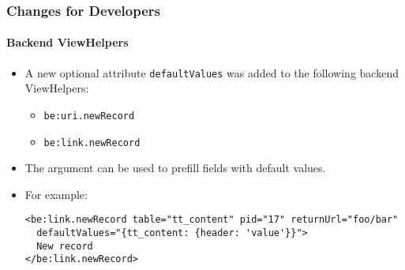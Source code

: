 %

\begin{frame}[fragile]
	\frametitle{Changes for Developers}
	\framesubtitle{Backend ViewHelpers}


	\begin{itemize}
		\item A new optional attribute \texttt{defaultValues} was added to the following
			backend ViewHelpers:

			\begin{itemize}\smaller
				\item \texttt{be:uri.newRecord}
				\item \texttt{be:link.newRecord}
			\end{itemize}\normalsize

		\item The argument can be used to prefill fields with default values.
		\item For example:
\begin{lstlisting}
<be:link.newRecord table="tt_content" pid="17" returnUrl="foo/bar"
  defaultValues="{tt_content: {header: 'value'}}">
  New record
</be:link.newRecord>
\end{lstlisting}
	\end{itemize}

\end{frame}

